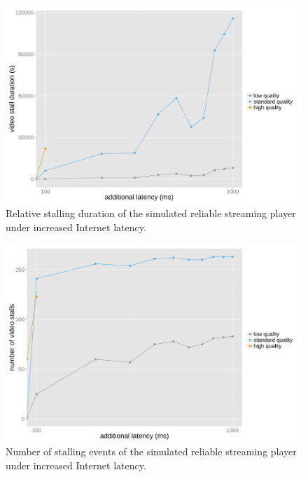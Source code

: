 
\begin{figure}[htb]
	\centering
	\includegraphics[width=1.0\textwidth]{images/R-ltesim-latencyseries-stallduration.pdf}
	\caption{Relative stalling duration of the simulated reliable streaming player under increased Internet latency.}
\label{c6:fig:ltesim-latencyseries-stallduration}
\end{figure}

\begin{figure}[htb]
	\centering
	\includegraphics[width=1.0\textwidth]{images/R-ltesim-latencyseries-numstalls.pdf}
	\caption{Number of stalling events of the simulated reliable streaming player under increased Internet latency.}
\label{c6:fig:ltesim-latencyseries-numstalls}
\end{figure}

